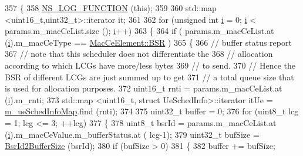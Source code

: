 \begin{DoxyCode}
357 \{
358         \hyperlink{log-macros-disabled_8h_a90b90d5bad1f39cb1b64923ea94c0761}{NS\_LOG\_FUNCTION} (\textcolor{keyword}{this});
359 
360         std::map <uint16\_t,uint32\_t>::iterator it;
361 
362         \textcolor{keywordflow}{for} (\textcolor{keywordtype}{unsigned} \textcolor{keywordtype}{int} \hyperlink{bernuolliDistribution_8m_a6f6ccfcf58b31cb6412107d9d5281426}{i} = 0; \hyperlink{bernuolliDistribution_8m_a6f6ccfcf58b31cb6412107d9d5281426}{i} < params.m\_macCeList.size (); \hyperlink{bernuolliDistribution_8m_a6f6ccfcf58b31cb6412107d9d5281426}{i}++)
363         \{
364                 \textcolor{keywordflow}{if} ( params.m\_macCeList.at (\hyperlink{bernuolliDistribution_8m_a6f6ccfcf58b31cb6412107d9d5281426}{i}).m\_macCeType == \hyperlink{structns3_1_1MacCeElement_a7b68183e7a7fd9b02783f92a2c645d7ba459101d6c51f15c22bfdf75d68f9c631}{MacCeElement::BSR} )
365                 \{
366                         \textcolor{comment}{// buffer status report}
367                         \textcolor{comment}{// note that this scheduler does not differentiate the}
368                         \textcolor{comment}{// allocation according to which LCGs have more/less bytes}
369                         \textcolor{comment}{// to send.}
370                         \textcolor{comment}{// Hence the BSR of different LCGs are just summed up to get}
371                         \textcolor{comment}{// a total queue size that is used for allocation purposes.}
372                         uint16\_t rnti = params.m\_macCeList.at (\hyperlink{bernuolliDistribution_8m_a6f6ccfcf58b31cb6412107d9d5281426}{i}).m\_rnti;
373                 std::map <uint16\_t, struct UeSchedInfo>::iterator itUe = 
      \hyperlink{classns3_1_1MmWaveFlexTtiMaxWeightMacScheduler_a6c90cb4d10b9d6347f7447508f5bebfe}{m\_ueSchedInfoMap}.find (rnti);
374 
375                         uint32\_t buffer = 0;
376                         \textcolor{keywordflow}{for} (uint8\_t lcg = 1; lcg <= 3; ++lcg)
377                         \{
378                                 uint8\_t bsrId = params.m\_macCeList.at (\hyperlink{bernuolliDistribution_8m_a6f6ccfcf58b31cb6412107d9d5281426}{i}).m\_macCeValue.m\_bufferStatus.at (
      lcg-1);
379                                 uint32\_t bufSize = \hyperlink{classns3_1_1MmWaveFlexTtiMaxWeightMacScheduler_ac76a6bf9876daf249269b621092be7dd}{BsrId2BufferSize} (bsrId);
380                                 \textcolor{keywordflow}{if} (bufSize > 0)
381                                 \{
382                                         buffer += bufSize;

\end{DoxyCode}
